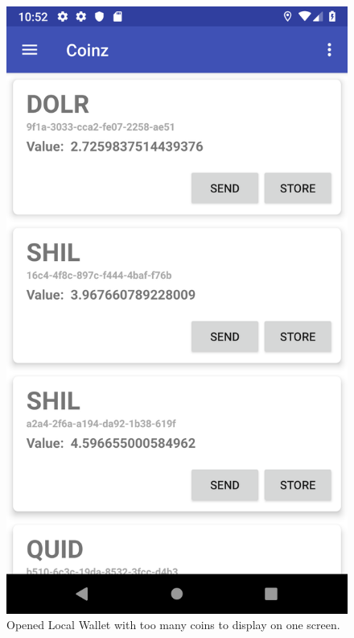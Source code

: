 \documentclass[11pt,a4paper,notitlepage]{article}
\begin{document}
\begin{figure}[H]
    \centering
    \begin{minipage}[t]{0.48\textwidth}
        \includegraphics[scale=0.2]{screenshots/local-wallet/too-many-coins-for-screen.png}
        \caption{Opened Local Wallet with too many coins to display on one screen.}
    \end{minipage}
    \begin{minipage}[t]{0.48\textwidth}

\end{minipage}
\end{figure}
\end{document}
